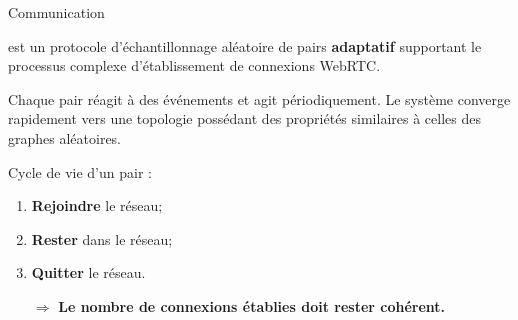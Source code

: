\begin{frame}{Communication}{\SPRAY}

  \SPRAY est un protocole d'échantillonnage aléatoire de pairs
  \textbf{adaptatif} supportant le processus complexe d'établissement de
  connexions WebRTC.

  \vspace{0.5cm}

  Chaque pair réagit à des événements et agit périodiquement. Le système
  converge rapidement vers une topologie possédant des propriétés similaires à
  celles des graphes aléatoires.

  \vspace{0.5cm}

  Cycle de vie d'un pair : 
  \begin{enumerate}
  \item \textbf{Rejoindre} le réseau;
  \item \textbf{Rester} dans le réseau;
  \item \textbf{Quitter} le réseau.
  \end{enumerate}

  \large
  \begin{itemize}
  \item [$\Rightarrow$] \textbf{Le nombre de connexions établies doit rester cohérent.}
  \end{itemize}
\end{frame}



